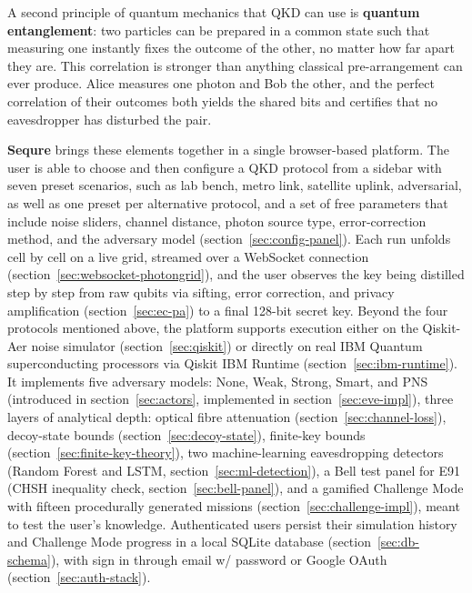 \documentclass[12pt, a4paper]{article}
\begin{document}
A second principle of quantum mechanics that QKD can use is
\textbf{quantum entanglement}: two particles can be prepared in
a common state such that measuring one instantly fixes the outcome of the other, no matter how far apart they are. This correlation is stronger than anything classical pre-arrangement can ever produce. Alice measures one photon and Bob the
other, and the perfect correlation of their outcomes both yields
the shared bits and certifies that no eavesdropper has disturbed
the pair.


\textbf{Sequre} brings these elements together in a single browser-based platform.
The user is able to choose and then configure a QKD protocol from a sidebar with
seven preset scenarios, such as lab bench, metro link, satellite uplink, adversarial,
as well as one preset per alternative protocol, and a set of free parameters that
include noise sliders, channel distance, photon source type, error-correction method,
and the adversary model (section~\ref{sec:config-panel}). Each run unfolds cell by
cell on a live grid, streamed over a WebSocket connection
(section~\ref{sec:websocket-photongrid}), and the user observes the key being
distilled step by step from raw qubits via sifting, error correction, and privacy
amplification (section~\ref{sec:ec-pa}) to a final 128-bit secret key. Beyond the
four protocols mentioned above, the platform supports execution either on the
Qiskit-Aer noise simulator (section~\ref{sec:qiskit}) or directly on real IBM
Quantum superconducting processors via Qiskit IBM Runtime
(section~\ref{sec:ibm-runtime}). It implements five adversary models: None, Weak,
Strong, Smart, and PNS (introduced in section~\ref{sec:actors}, implemented in
section~\ref{sec:eve-impl}), three layers of analytical depth: optical fibre
attenuation (section~\ref{sec:channel-loss}), decoy-state bounds
(section~\ref{sec:decoy-state}), finite-key bounds
(section~\ref{sec:finite-key-theory}), two machine-learning eavesdropping detectors
(Random Forest and LSTM, section~\ref{sec:ml-detection}), a Bell test panel for E91
(CHSH inequality check, section~\ref{sec:bell-panel}), and a gamified Challenge Mode
with fifteen procedurally generated missions (section~\ref{sec:challenge-impl}),
meant to test the user's knowledge. Authenticated users persist their simulation
history and Challenge Mode progress in a local SQLite database
(section~\ref{sec:db-schema}), with sign in through email w/ password or Google
OAuth (section~\ref{sec:auth-stack}).
\end{document}
